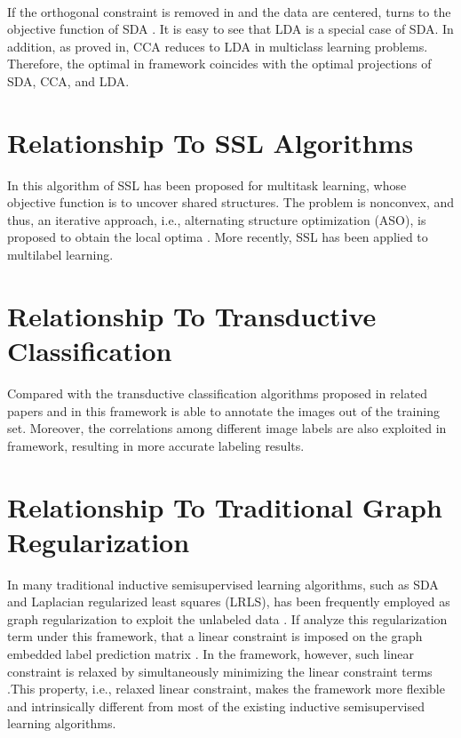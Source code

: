 \documentclass[a4paper,11pt]{report}
\begin{document}
\paragraph{}
If the orthogonal constraint is removed in  and the data are centered, turns to the objective function of SDA . It is easy to see that LDA is a special case of SDA. In addition, as proved in, CCA reduces to LDA in multiclass learning problems. Therefore, the optimal in framework coincides with the optimal projections of SDA, CCA, and LDA.


\section{Relationship To SSL Algorithms}  
 In this algorithm of SSL has been proposed for multitask learning, whose objective function is to uncover shared structures. The problem is nonconvex, and thus, an iterative approach, i.e., alternating structure optimization (ASO), is proposed to obtain the local optima . More recently, SSL has been applied to multilabel learning.

\section{Relationship To Transductive Classification  } 
Compared with the transductive classification algorithms proposed in related papers and in this framework is able to annotate the images out of the training set. Moreover, the correlations among different image labels are also exploited in  framework, resulting in more accurate labeling results.

\section{Relationship To Traditional Graph Regularization } 
In many traditional inductive  semisupervised learning algorithms, such as SDA  and Laplacian regularized least squares (LRLS), has been frequently employed as graph regularization to exploit the unlabeled data . If  analyze this regularization term under this framework, that a linear constraint is imposed on the graph embedded label prediction matrix . In the framework, however, such linear constraint is relaxed by simultaneously minimizing the linear constraint  terms .This property, i.e., relaxed linear constraint, makes the framework more flexible  and intrinsically different from most of the existing inductive semisupervised learning algorithms.
 
\end{document}
